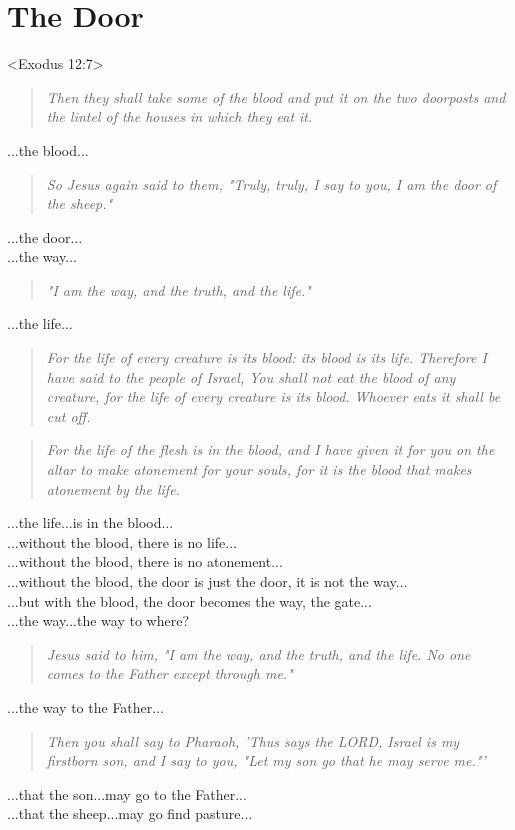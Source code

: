\documentclass[10pt,oneside,footinclude=true,headinclude=true]{scrbook} %
\newcommand\quot[1]{
	\begin{quote}\textit{\small#1}\end{quote}
}
\begin{document}
\chapter{The Door}
<Exodus 12:7>
\quot{Then they shall take some of the blood and put it on the two doorposts and the lintel of the houses in which they eat it.}

\noindent...the blood...

\quot{So Jesus again said to them, "Truly, truly, I say to you, I am the door of the sheep."}

\noindent...the door...\\
...the way...

\quot{"I am the way, and the truth, and the life."}

\noindent...the life...

\quot{For the life of every creature is its blood: its blood is its life. Therefore I have said to the people of Israel, You shall not eat the blood of any creature, for the life of every creature is its blood. Whoever eats it shall be cut off.}

\quot{For the life of the flesh is in the blood, and I have given it for you on the altar to make atonement for your souls, for it is the blood that makes atonement by the life.}

\noindent...the life...is in the blood...\\
...without the blood, there is no life...\\
...without the blood, there is no atonement...\\
...without the blood, the door is just the door, it is not the way...\\
...but with the blood, the door becomes the way, the gate...\\

\noindent...the way...the way to where?

\quot{Jesus said to him, "I am the way, and the truth, and the life. No one comes to the Father except through me."}

\noindent...the way to the Father...

\quot{Then you shall say to Pharaoh, 'Thus says the LORD, Israel is my firstborn son,  and I say to you, "Let my son go that he may serve me."'}

\noindent...that the son...may go to the Father...\\
...that the sheep...may go find pasture...
\end{document}
